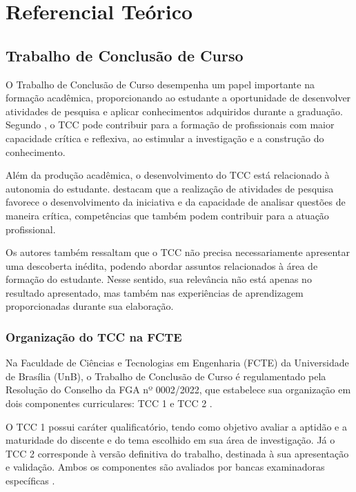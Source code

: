 \chapter[Referencial Teórico]{Referencial Teórico}

\section{Trabalho de Conclusão de Curso}

O Trabalho de Conclusão de Curso desempenha um papel
importante na formação acadêmica, proporcionando ao
estudante a oportunidade de desenvolver atividades de
pesquisa e aplicar conhecimentos adquiridos durante a
graduação. Segundo , o TCC
pode contribuir para a formação de profissionais com
maior capacidade crítica e reflexiva, ao estimular a
investigação e a construção do conhecimento.

Além da produção acadêmica, o desenvolvimento do TCC
está relacionado à autonomia do estudante.
 destacam que a realização
de atividades de pesquisa favorece o desenvolvimento
da iniciativa e da capacidade de analisar questões
de maneira crítica, competências que também podem
contribuir para a atuação profissional.

Os autores também ressaltam que o TCC não precisa
necessariamente apresentar uma descoberta inédita,
podendo abordar assuntos relacionados à área de
formação do estudante. Nesse sentido, sua relevância
não está apenas no resultado apresentado, mas também
nas experiências de aprendizagem proporcionadas
durante sua elaboração.


\subsection{Organização do TCC na FCTE}

Na Faculdade de Ciências e Tecnologias em Engenharia (FCTE)
da Universidade de Brasília (UnB), o Trabalho de Conclusão
de Curso é regulamentado pela Resolução do Conselho da FGA
nº 0002/2022, que estabelece sua organização em dois
componentes curriculares: TCC 1 e TCC 2 \cite{UnB2022}.

O TCC 1 possui caráter qualificatório, tendo como objetivo
avaliar a aptidão e a maturidade do discente e do tema
escolhido em sua área de investigação. Já o TCC 2 corresponde à versão definitiva do trabalho, destinada à sua apresentação e validação. Ambos os componentes são avaliados por bancas examinadoras específicas \cite{UnB2022}.

